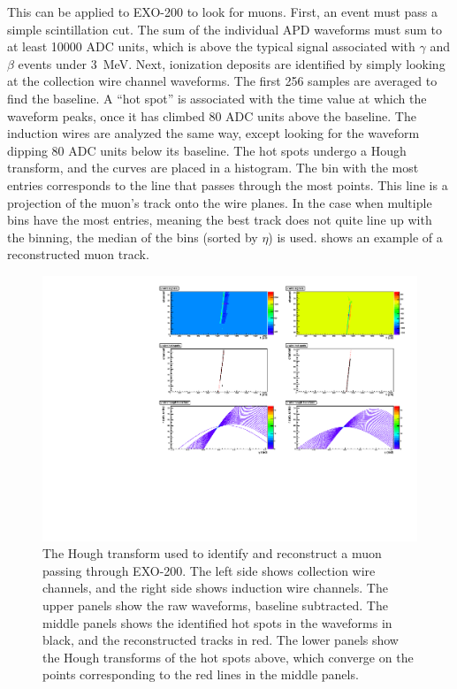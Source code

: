 \documentclass[herrin-thesis.tex]{subfiles}
\begin{document}
This can be applied to EXO-200 to look for muons. First, an event must pass a simple scintillation cut. The sum of the individual APD waveforms must sum to at least 10000 ADC units, which is  above the typical signal associated with \(\gamma\) and \(\beta\) events under \SI{3}{MeV}. Next, ionization deposits are identified by simply looking at the collection wire channel waveforms. The first 256 samples are averaged to find the baseline.  A ``hot spot'' is associated with the time value at which the waveform peaks, once it has climbed 80 ADC units above the baseline. The induction wires are analyzed the same way, except looking for the waveform dipping 80 ADC units below its baseline. The hot spots undergo a Hough transform, and the curves are placed in a histogram. The bin with the most entries corresponds to the line that passes through the most points. This line is a projection of the muon's track onto the wire planes. In the case when multiple bins have the most entries, meaning the best track does not quite line up with the binning, the median of the bins (sorted by \(\eta\)) is used.  shows an example of a reconstructed muon track.

\begin{figure}[tp]
\centering
\includegraphics[width=1\columnwidth]{./plots/muon_houghtransform_run_4685_ev_67.pdf}
\caption[Identifying a muon with the Hough transform]{The Hough transform used to identify and reconstruct a muon passing through EXO-200. The left side shows collection wire channels, and the right side shows induction wire channels. The upper panels show the raw waveforms, baseline subtracted. The middle panels shows the identified hot spots in the waveforms in black, and the reconstructed tracks in red. The lower panels show the Hough transforms of the hot spots above, which converge on the points corresponding to the red lines in the middle panels.}
\label{fig:muon:houghtransform}
\end{figure}
\end{document}
